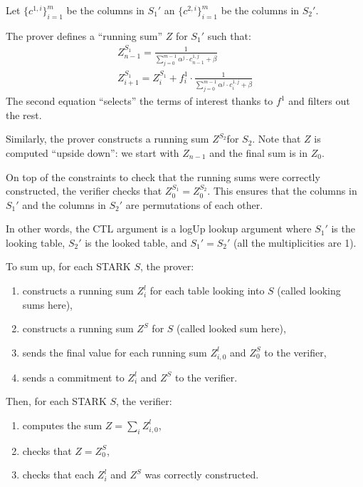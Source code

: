 Let $\{c^{1, i}\}_{i=1}^m$ be the columns in $S_1'$ an $\{c^{2,i}\}_{i=1}^m$ be the columns in $S_2'$.

The prover defines a ``running sum'' $Z$ for $S_1'$ such that:
\begin{gather*}
  Z^{S_1}_{n-1} = \frac{1}{\sum_{j=0}^{m-1} \alpha^j \cdot c^{1, j}_{n-1} + \beta} \\
  Z^{S_1}_{i+1} = Z^{S_1}_i + f^1_i \cdot \frac{1}{\sum_{j=0}^{m-1} \alpha^j \cdot c^{1, j}_i + \beta}
\end{gather*}
The second equation ``selects'' the terms of interest thanks to $f^1$ and filters out the rest.

Similarly, the prover constructs a running sum $Z^{S_2}$for $S_2$. Note that $Z$ is computed ``upside down'': we start with $Z_{n-1}$ and the final sum is in $Z_0$. 

On top of the constraints to check that the running sums were correctly constructed, the verifier checks that $Z^{S_1}_0 = Z^{S_2}_0$.
This ensures that the columns in $S_1'$ and the columns in $S_2'$ are permutations of each other.

In other words, the CTL argument is a logUp lookup argument where $S_1'$ is the looking table, $S_2'$ is the looked table, and $S_1' = S_2'$ (all the multiplicities are 1).

To sum up, for each STARK $S$, the prover:
\begin{enumerate}
  \item constructs a running sum $Z_i^l$ for each table looking into $S$ (called looking sums here),
  \item constructs a running sum $Z^S$ for $S$ (called looked sum here),
  \item sends the final value for each running sum $Z_{i, 0}^l$ and $Z^S_0$ to the verifier,
  \item sends a commitment to $Z_i^l$  and $Z^S$ to the verifier.
\end{enumerate}
Then, for each STARK $S$, the verifier:
\begin{enumerate}
  \item computes the sum $Z = \sum_i Z_{i, 0}^l$,
  \item checks that $Z = Z^S_0$,
  \item checks that each $Z_i^l$  and $Z^S$ was correctly constructed.
\end{enumerate}
